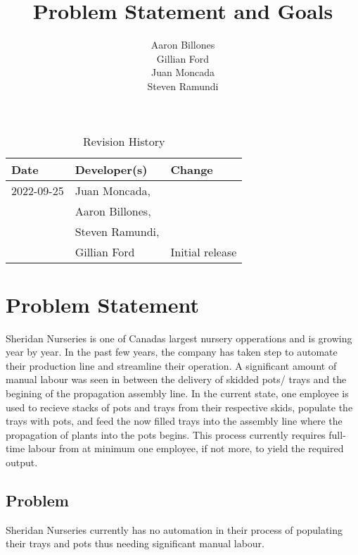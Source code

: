 \documentclass{article}
\title{Problem Statement and Goals\\\progname}
\author{Aaron Billones\\Gillian Ford\\Juan Moncada\\Steven Ramundi}
\date{}
\begin{document}
\maketitle

\begin{table}[hp]
\caption{Revision History} \label{TblRevisionHistory}
\begin{tabularx}{\textwidth}{llX}
\toprule
\textbf{Date} & \textbf{Developer(s)} & \textbf{Change}\\
\midrule
2022-09-25 & Juan Moncada,\\&Aaron Billones,\\&Steven Ramundi,\\&Gillian Ford & Initial release\\
 
\bottomrule
\end{tabularx}
\end{table}

\section{Problem Statement}

Sheridan Nurseries is one of Canadas largest nursery opperations and is growing year by year.
In the past few years, the company has taken step to automate their production line and streamline their operation.
A significant amount of manual labour was seen in between the delivery of skidded pots/ trays and the begining of the propagation 
assembly line. In the current state, one employee is used to recieve stacks of pots and trays from their respective skids,
populate the trays with pots, and feed the now filled trays into the assembly line where the propagation of plants into the pots begins.
This process currently requires full-time labour from at minimum one employee, if not more, to yield the required output.



\subsection{Problem}
Sheridan Nurseries currently has no automation in their process of populating their trays and pots thus needing significant manual labour.
\end{document}
